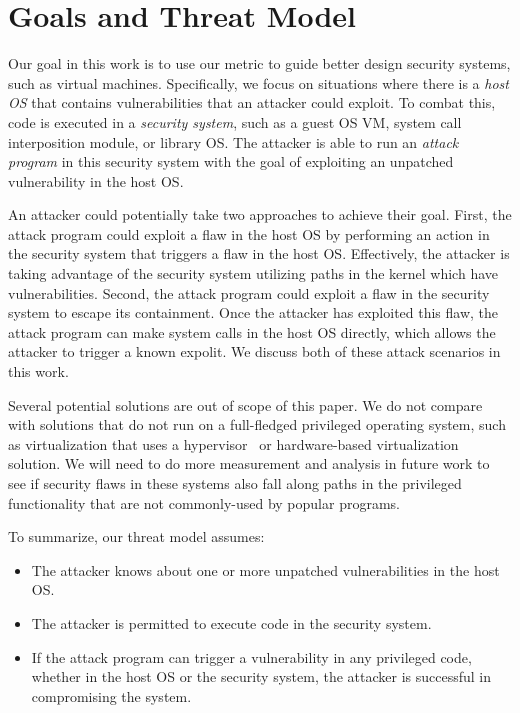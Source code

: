 \section{Goals and Threat Model}
\label{sec.motivation-and-background}

Our goal in this work is to use our metric to guide better design
security systems, such as virtual machines.  Specifically, we focus on 
situations where there is a \emph{host OS} that contains vulnerabilities
that an attacker could exploit.  To combat this, 
code is executed in a \emph{security system}, such as a guest OS VM, 
system call interposition module, or library OS.  The attacker is able to
run an \emph{attack program} in this security system with the goal of
exploiting an unpatched vulnerability in the host OS. 

An attacker could potentially take two approaches to achieve their
goal.  First, the attack program could exploit a flaw in the host OS by 
performing an action in the security system that triggers a flaw in
the host OS.  Effectively, the attacker is taking advantage of the security 
system utilizing paths in the kernel which have vulnerabilities.
Second, the attack program could exploit a flaw in the security system to 
escape its containment.  Once the attacker has exploited this flaw, the
attack program can make system calls in the host OS directly, which allows
the attacker to trigger a known expolit.  We discuss both of these attack 
scenarios in this work.


Several potential solutions are out of scope of this
paper.  We do not compare with solutions that do not run on a full-fledged 
privileged operating system, such as virtualization that uses a 
hypervisor~ or hardware-based virtualization 
solution.  
We will need to do more measurement and analysis
in future work to see if security flaws in these systems also fall along
paths in the privileged functionality that are not commonly-used by popular
programs.

To summarize, our threat model assumes:

\begin{itemize}\setlength\itemsep{0em}
\item The attacker knows about one or more unpatched vulnerabilities in the 
host OS.

\item The attacker is permitted to execute code in the security
system.

\item If the attack program can trigger a vulnerability in any privileged code,
whether in the host OS or the security system, the attacker is successful in 
compromising the system.

\end{itemize}

